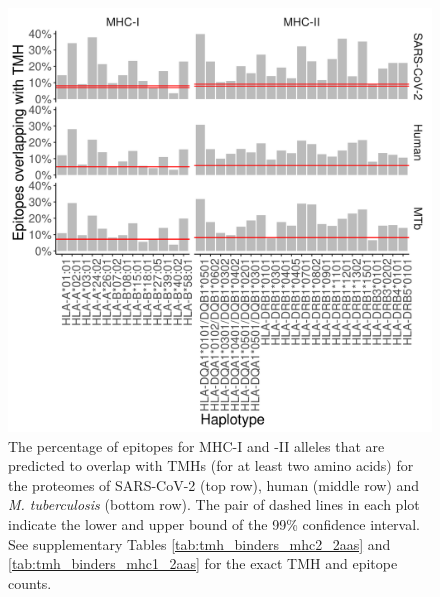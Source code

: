 \begin{figure}[!htbp]
  \includegraphics[width=\textwidth]{bbbq_1_smart_2aa_results/fig_f_tmh_2_panel.png}
  \caption{
    The percentage of epitopes for MHC-I and -II alleles that are predicted to 
    overlap with TMHs (for at least two amino acids) 
    for the proteomes of SARS-CoV-2 (top row), human (middle 
    row) and \emph{M. tuberculosis} (bottom row).
    The pair of dashed lines in each plot indicate the lower and upper bound of the 99\% confidence interval.
    See supplementary Tables \ref{tab:tmh_binders_mhc2_2aas} and \ref{tab:tmh_binders_mhc1_2aas}
    for the exact TMH and  epitope counts.
  }
  \label{fig:bbbq_1_smart_results_2aas}
\end{figure}





\clearpage

